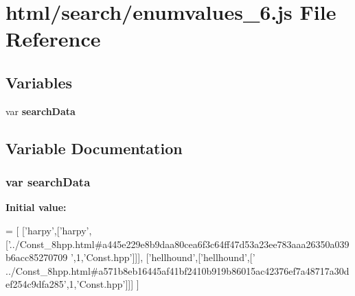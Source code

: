 \section{html/search/enumvalues\-\_\-6.js File Reference}
\label{enumvalues__6_8js}
\subsection*{Variables}
\begin{DoxyCompactItemize}
\item 
var {\bf search\-Data}
\end{DoxyCompactItemize}


\subsection{Variable Documentation}
\subsubsection[{search\-Data}]{\setlength{\rightskip}{0pt plus 5cm}var search\-Data}\label{enumvalues__6_8js_ad01a7523f103d6242ef9b0451861231e}
{\bfseries Initial value\-:}
\begin{DoxyCode}
=
[
  [\textcolor{stringliteral}{'harpy'},[\textcolor{stringliteral}{'harpy'},[\textcolor{stringliteral}{'../Const\_8hpp.html#a445e229e8b9daa80cea6f3c64ff47d53a23ee783aaa26350a039b6acc85270709
      '},1,\textcolor{stringliteral}{'Const.hpp'}]]],
  [\textcolor{stringliteral}{'hellhound'},[\textcolor{stringliteral}{'hellhound'},[\textcolor{stringliteral}{'
      ../Const\_8hpp.html#a571b8eb16445af41bf2410b919b86015ac42376ef7a48717a30def254c9dfa285'},1,\textcolor{stringliteral}{'Const.hpp'}]]]
]
\end{DoxyCode}
